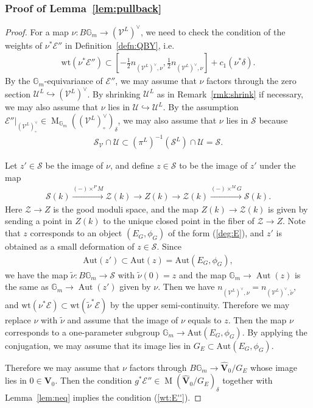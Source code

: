 \documentclass [11pt,oneside,a4paper,mathscr]{amsart}
\theoremstyle{definition}
\newcommand{\E}{\mathcal{E}}
\newcommand{\sS}{\mathcal{S}}
\newcommand{\zZ}{\mathcal{Z}}
\newcommand{\U}{\mathcal{U}}
\newcommand{\V}{\mathcal{V}}
\newcommand{\MM}{\operatorname{M}}
\newcommand{\bgm}{B\mathbb{G}_m}
\newcommand{\Aut}{\operatorname{Aut}}
\newcommand{\wt}{\mathrm{wt}}
\begin{document}
\subsubsection{Proof of Lemma~\ref{lem:pullback}}\label{subsub:3}
\begin{proof}
For a map $\nu \colon \bgm \to (\V^L)^{\vee}$,  
we need to check the condition of the weights of $\nu^{\ast}\E''$ in Definition~\ref{defn:QBY},
i.e. 
\begin{align}\label{wt:E''}
\wt(\nu^{\ast}\E'') \subset \left[-\frac{1}{2}n_{(\V^L)^{\vee}, \nu}, 
\frac{1}{2}n_{(\V^L)^{\vee}, \nu}
\right] +c_1(\nu^{\ast}\delta). 
\end{align}
By the $\mathbb{G}_m$-equivariance of $\mathcal{E}''$, we may assume that 
$\nu$ factors through the zero section
$\U^L \hookrightarrow (\V^L)^{\vee}$. By shrinking $\U^L$ as in Remark~\ref{rmk:shrink} if necessary, 
we may also assume that $\nu$ lies in $\U \hookrightarrow \U^L$. 
By the assumption $\E''|_{(\V^L)^{\vee}_{\circ}} \in \MM_{\mathbb{G}_m}((\V^L)^{\vee}_{\circ})_{\delta}$, 
we may also assume that $\nu$ lies in $\mathcal{S}$ because 
\begin{align*}
    \mathcal{S}_{\mathcal{V}}\cap \mathcal{U} \subset (\pi^L)^{-1}(\mathcal{S}^L)\cap \mathcal{U} =\mathcal{S}. 
\end{align*}

Let $z' \in \sS$ be the image of $\nu$, and define $z \in \mathcal{S}$ to be 
the image of $z'$ under the map 
\begin{align*}
\mathcal{S}(k) \stackrel{(-)\times^P M}{\to} \zZ(k) \to Z(k) \to \zZ(k) \stackrel{(-)\times^M G}{\to} \mathcal{S}(k).
\end{align*}
Here $\mathcal{Z} \to Z$ is the good moduli space, and 
the map $Z(k) \to \zZ(k)$ is given by sending a point in $Z(k)$ to the unique 
closed point in the fiber of $\zZ\to Z$. Note that 
$z$ corresponds to an object $(E_G, \phi_G)$ of the form (\ref{deg:E}), 
and 
$z'$ is obtained 
as a small deformation of
$z \in \sS$. 
Since 
\begin{align*}\mathrm{Aut}(z') \subset \mathrm{Aut}(z)=\mathrm{Aut}(E_G, \phi_G),
\end{align*}
we have the map $\widetilde{\nu} \colon \bgm \to \mathcal{S}$ with $\widetilde{\nu}(0)=z$ and 
the map $\mathbb{G}_m \to \Aut(z)$ is the same as $\mathbb{G}_m \to \Aut(z')$ given by $\nu$. 
Then we have $n_{(\mathcal{V}^L)^{\vee}, \nu}=n_{(\mathcal{V}^L)^{\vee}, \widetilde{\nu}}$, 
and $\wt(\nu^*\mathcal{E}) \subset \wt(\widetilde{\nu}^* \mathcal{E})$ by the upper semi-continuity. 
Therefore 
we may replace $\nu$ with $\widetilde{\nu}$ and assume that the image of $\nu$ equals to $z$. 
Then the map $\nu$ corresponds to a one-parameter subgroup $\mathbb{G}_m \to \mathrm{Aut}(E_G, \phi_G)$. 
By applying the conjugation, we may assume that its image lies in $G_E \subset \mathrm{Aut}(E_G, \phi_G)$.

Therefore 
we may assume that $\nu$ factors through 
$\bgm \to \widehat{\mathbf{V}}_0/G_E$ whose image lies in $0 \in \mathbf{V}_0$. 
Then the condition $g^{\ast}\E'' \in \MM(\widehat{\mathbf{V}}_0/G_E)_{\delta}$
together with Lemma~\ref{lem:neq} implies the condition (\ref{wt:E''}). 
\end{proof}
\end{document}
